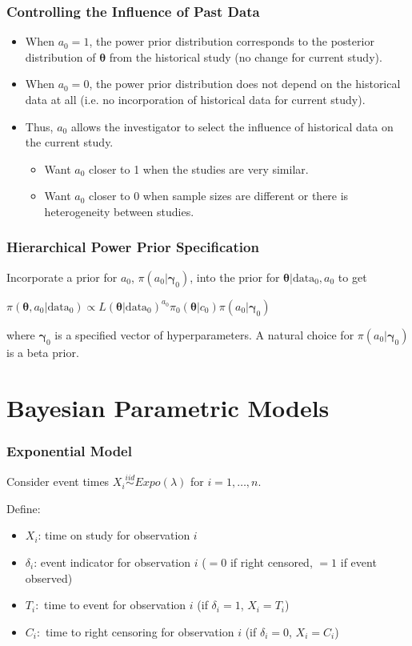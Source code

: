 \documentclass{beamer}
\begin{document}
\begin{frame}
\frametitle{Controlling the Influence of Past Data}
\begin{itemize}
\item When \color{orange}$a_0 = 1$\color{black}, the power prior distribution corresponds to the posterior distribution of $\pmb{\theta}$ from the historical study (no change for current study).
\item When \color{orange}$a_0 = 0$\color{black}, the power prior distribution does not depend on the historical data at all (i.e. no incorporation of historical data for current study). 
\item Thus, $a_0$ allows the investigator to select the influence of historical data on the current study. 
	\begin{itemize}
	\item Want $a_0$ closer to 1 when the studies are very similar. 
	\item Want $a_0$ closer to 0 when sample sizes are different or there is heterogeneity between studies. 
	\end{itemize} 
\end{itemize}
\end{frame}

\begin{frame}
\frametitle{Hierarchical Power Prior Specification}
Incorporate a prior for $a_0$, $\pi(a_0|\pmb{\gamma}_0)$, into the prior for $\pmb{\theta}|\text{data}_0, a_0$ to get
\begin{center}
$\pi(\pmb{\theta}, a_0|\text{data}_0) \propto L(\pmb{\theta}|\text{data}_0)^{a_0}\pi_0(\pmb{\theta}|c_{0})\pi(a_0|\pmb{\gamma}_0)$
\end{center}
where $\pmb{\gamma}_0$ is a specified vector of hyperparameters. A natural choice for $\pi(a_0|\pmb{\gamma}_0)$ is a \color{orange} beta prior\color{black}. 
\end{frame}

\section{Bayesian Parametric Models}
\begin{frame}
\frametitle{Exponential Model}
Consider event times $X_i \overset{iid}{\sim} Expo(\lambda)$ for $i = 1, \ldots, n$. 

Define:
\begin{itemize}
\item$X_i$: time on study for observation $i$
\item $\delta_i$: event indicator for observation $i$ ($=0$ if right censored, $=1$ if event observed)
\item $T_i:$ time to event for observation $i$ (if $\delta_i = 1$, $X_i = T_i$)
\item $C_i:$ time to right censoring for observation $i$ (if $\delta_i = 0$, $X_i = C_i$)
\end{itemize}
\end{frame}
\end{document}
